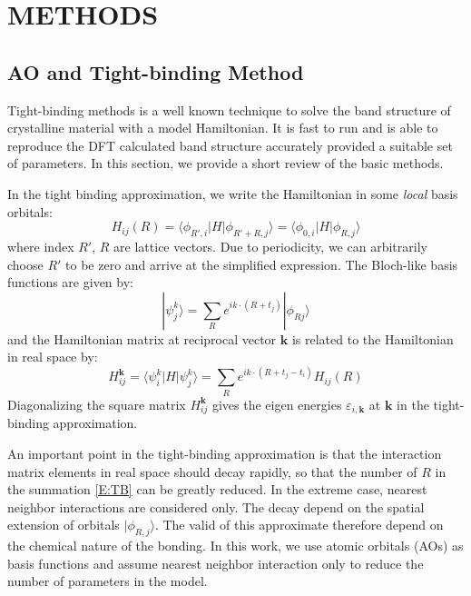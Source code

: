 \documentclass{article}
\begin{document}
\section{METHODS}

\subsection{AO and Tight-binding Method}
Tight-binding methods is a well known technique to solve the band structure of 
crystalline material with a model Hamiltonian\cite{ziman_principles_1999}. 
It is fast to run and is able to reproduce the DFT calculated band structure accurately 
provided a suitable set of parameters. In this section, we provide a short review of the 
basic methods.

In the tight binding approximation, we write the Hamiltonian in some \emph{local}
basis orbitals:
\begin{equation}
    H_{ij}(R) = \langle \phi_{R',i} | H | \phi_{R'+R,j} \rangle = \langle \phi_{0,i} | H | \phi_{R,j} \rangle
\end{equation}
where index $R'$, $R$ are lattice vectors. Due to periodicity, we can arbitrarily choose $R'$ to be zero
and arrive at the simplified expression.
The Bloch-like basis functions are given by:
\begin{equation}
    |\psi_j^k\rangle = \sum_R e^{ik\cdot(R+t_j)} |\phi_{Rj} \rangle
\end{equation}
and the Hamiltonian matrix at reciprocal vector $\mathbf{k}$ is related to the 
Hamiltonian in real space by:
\begin{equation}
    \label{E:TB}
    H_{ij}^{\mathbf{k}} = \langle \psi_i^k | H |\psi_j^k\rangle = \sum_R e^{ik\cdot(R+t_j-t_i)} H_{ij}(R)
\end{equation}
Diagonalizing the square matrix $H_{ij}^{\mathbf{k}}$ gives the eigen energies $\varepsilon_{i,\mathbf{k}}$ 
at $\mathbf{k}$ in the tight-binding approximation. 

An important point in the tight-binding approximation is that the interaction matrix elements in real
space should decay rapidly, so that the number of $R$ in the summation \eqref{E:TB} can be greatly 
reduced. In the extreme case, nearest neighbor interactions are considered only. 
The decay depend on the spatial extension of orbitals $|\phi_{R,j}\rangle$. 
The valid of this approximate therefore depend on the chemical nature of the bonding. In this work, we use 
atomic orbitals (AOs) as basis functions and assume nearest neighbor interaction only to reduce the 
number of parameters in the model. 
\end{document}
